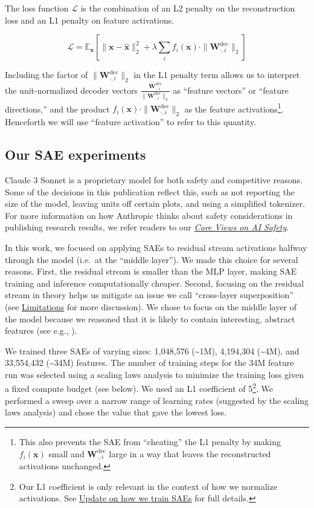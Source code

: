 \documentclass{article}
\let\oldsubsection\subsection
\renewcommand{\subsection}{\FloatBarrier\oldsubsection}
\begin{document}
The loss function $\mathcal{L}$ is the combination of an L2 penalty on the reconstruction loss and an L1 penalty on feature activations.

$$\mathcal{L} = \mathbb{E}_\mathbf{x} \left[ \|\mathbf{x}-\hat{\mathbf{x}}\|_2^2 + \lambda\sum_i f_i(\mathbf{x}) \cdot \|\mathbf{W}^\text{dec}_{\cdot,i}\|_2 \right]$$

Including the factor of $\|\mathbf{W}^\text{dec}_{\cdot,i}\|_2$ in the L1 penalty term allows us to interpret the unit-normalized decoder vectors $\displaystyle\frac{\mathbf{W}^\text{dec}_{\cdot,i}}{\|\mathbf{W}^\text{dec}_{\cdot,i}\|_2}$ as “feature vectors” or “feature directions,” and the product $f_i(\mathbf{x}) \cdot \|\mathbf{W}^\text{dec}_{\cdot,i}\|_2$ as the feature activations\footnote{This also prevents the SAE from “cheating” the L1 penalty by making $f_i(\mathbf{x})$ small and $\mathbf{W}^\text{dec}_{\cdot,i}$ large in a way that leaves the reconstructed activations unchanged.}. Henceforth we will use “feature activation” to refer to this quantity.

\subsection{Our SAE experiments}\label{sec:scaling-sae-experiments}

Claude 3 Sonnet is a proprietary model for both safety and competitive reasons. Some of the decisions in this publication reflect this, such as not reporting the size of the model, leaving units off certain plots, and using a simplified tokenizer. For more information on how Anthropic thinks about safety considerations in publishing research results, we refer readers to our \textit{\href{https://www.anthropic.com/news/core-views-on-ai-safety}{Core Views on AI Safety}}.

In this work, we focused on applying SAEs to residual stream activations halfway through the model (i.e.~at the “middle layer”). We made this choice for several reasons. First, the residual stream is smaller than the MLP layer, making SAE training and inference computationally cheaper. Second, focusing on the residual stream in theory helps us mitigate an issue we call “cross-layer superposition” (see \hyperref[sec:discussion-limitations]{Limitations} for more discussion). We chose to focus on the middle layer of the model because we reasoned that it is likely to contain interesting, abstract features (see e.g., \cite{jermyn20248l,elhage2022solu,40l2021l}).

We trained three SAEs of varying sizes: 1,048,576 (\textasciitilde{}1M), 4,194,304 (\textasciitilde{}4M), and 33,554,432 (\textasciitilde{}34M) features. The number of training steps for the 34M feature run was selected using a scaling laws analysis to minimize the training loss given a fixed compute budget (see below). We used an L1 coefficient of 5\footnote{Our L1 coefficient is only relevant in the context of how we normalize activations. See \href{https://transformer-circuits.pub/2024/april-update/index.html\#training-saes}{Update on how we train SAEs} for full details.}. We performed a sweep over a narrow range of learning rates (suggested by the scaling laws analysis) and chose the value that gave the lowest loss.
\end{document}

